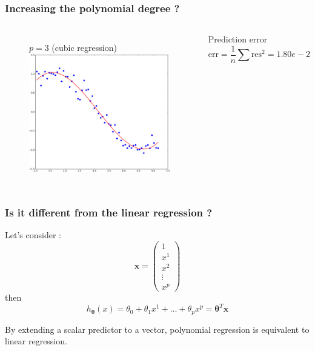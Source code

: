 \documentclass[handout]{beamer}
\begin{document}
\begin{frame}
\frametitle{Increasing the polynomial degree ?}
\begin{columns}
\begin{figure}
$p=3$ (cubic regression)\\
\includegraphics[width=0.99\textwidth]{./fig/L1/linreg_pow3.png}
\end{figure}
\begin{block}{Prediction error}
$$
\text{err} = \frac{1}{n}\sum \text{res}^2 = 1.80e-2
$$
\end{block}
\end{columns}
\end{frame}


\begin{frame}
\frametitle{Is it different from the linear regression ?}
Let's consider :
$$
\bm{x} = 
\begin{pmatrix}
1 \\
x^1 \\
x^2 \\
\vdots \\
x^p
\end{pmatrix}
$$
then
$$
h_{\bm{\theta}}(x) = \theta_0  + \theta_1 x^1 + \ldots + \theta_p x^p = \bm{\theta}^T \bm{x}
$$
\begin{alertblock}{}
By extending a scalar predictor to a vector,
polynomial regression is equivalent to linear regression.
\end{alertblock}

\end{frame}
\end{document}
